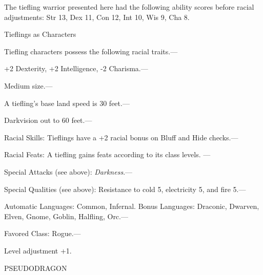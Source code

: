 \documentclass{article}
\begin{document}
The tiefling warrior presented here had the following ability scores before racial 
adjustments: Str 13, Dex 11, Con 12, Int 10, Wis 9, Cha 8.

Tieflings as Characters

Tiefling characters possess the following racial traits.--- 

\parindent=3pt
+2 Dexterity, +2 Intelligence, -2 Charisma.---

\parindent=0pt
Medium size.---

A tiefling's base land speed is 30 feet.---

Darkvision out to 60 feet.---

Racial Skills: Tieflings have a +2 racial bonus on Bluff and Hide checks.---

Racial Feats: A tiefling gains feats according to its class levels. ---

Special Attacks (see above): \textit{Darkness}.---

Special Qualities (see above): Resistance to cold 5, electricity 5, and fire 5.---

Automatic Languages: Common, Infernal. Bonus Languages: Draconic, Dwarven, Elven, 
Gnome, Goblin, Halfling, Orc.---

Favored Class: Rogue.---

Level adjustment +1.

\vspace{12pt}
{\LARGE{}PSEUDODRAGON}
\end{document}
